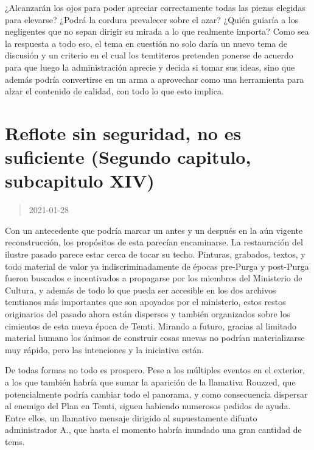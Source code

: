 \documentclass[
  spanish,
]{book}
\begin{document}
¿Alcanzarán los ojos para poder apreciar correctamente todas las piezas elegidas para elevarse? ¿Podrá la cordura prevalecer sobre el azar? ¿Quién guiaría a los negligentes que no sepan dirigir su mirada a lo que realmente importa?
Como sea la respuesta a todo eso, el tema en cuestión no solo daría un nuevo tema de discusión y un criterio en el cual los temtiteros pretenden ponerse de acuerdo para que luego la administración aprecie y decida si tomar sus ideas, sino que además podría convertirse en un arma a aprovechar como una herramienta para alzar el contenido de calidad, con todo lo que esto implica.

\hypertarget{reflote-sin-seguridad-no-es-suficiente-segundo-capitulo-subcapitulo-xiv}{%
\section{Reflote sin seguridad, no es suficiente (Segundo capitulo, subcapitulo XIV)}\label{reflote-sin-seguridad-no-es-suficiente-segundo-capitulo-subcapitulo-xiv}}

\begin{quote}
2021-01-28
\end{quote}

Con un antecedente que podría marcar un antes y un después en la aún vigente reconstrucción, los propósitos de esta parecían encaminarse. La restauración del ilustre pasado parece estar cerca de tocar su techo. Pinturas, grabados, textos, y todo material de valor ya indiscriminadamente de épocas pre-Purga y post-Purga fueron buscados e incentivados a propagarse por los miembros del Ministerio de Cultura, y además de todo lo que pueda ser accesible en los dos archivos temtianos más importantes que son apoyados por el ministerio, estos restos originarios del pasado ahora están dispersos y también organizados sobre los cimientos de esta nueva época de Temti. Mirando a futuro, gracias al limitado material humano los ánimos de construir cosas nuevas no podrían materializarse muy rápido, pero las intenciones y la iniciativa están.

De todas formas no todo es prospero. Pese a los múltiples eventos en el exterior, a los que también habría que sumar la aparición de la llamativa Rouzzed, que potencialmente podría cambiar todo el panorama, y como consecuencia dispersar al enemigo del Plan en Temti, siguen habiendo numerosos pedidos de ayuda. Entre ellos, un llamativo mensaje dirigido al supuestamente difunto administrador A., que hasta el momento habría inundado una gran cantidad de tems.
\end{document}
